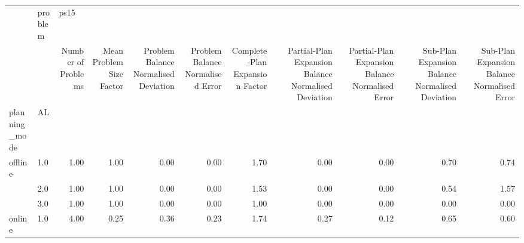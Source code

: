 \begin{tabular}{llrrrrrrrrr}
\toprule
       & problem & \multicolumn{9}{l}{ps15} \\
       & {} & Number of Problems & Mean Problem Size Factor & Problem Balance Normalised Deviation & Problem Balance Normalised Error & Complete-Plan Expansion Factor & Partial-Plan Expansion Balance Normalised Deviation & Partial-Plan Expansion Balance Normalised Error & Sub-Plan Expansion Balance Normalised Deviation & Sub-Plan Expansion Balance Normalised Error \\
planning\_mode & AL &                    &                          &                                      &                                  &                                &                                                     &                                                 &                                                 &                                             \\
\midrule
offline & 1.0 &               1.00 &                     1.00 &                                 0.00 &                             0.00 &                           1.70 &                                               0.00 &                                            0.00 &                                            0.70 &                                        0.74 \\
       & 2.0 &               1.00 &                     1.00 &                                 0.00 &                             0.00 &                           1.53 &                                               0.00 &                                            0.00 &                                            0.54 &                                        1.57 \\
       & 3.0 &               1.00 &                     1.00 &                                 0.00 &                             0.00 &                           1.00 &                                               0.00 &                                            0.00 &                                            0.00 &                                        0.00 \\
online & 1.0 &               4.00 &                     0.25 &                                 0.36 &                             0.23 &                           1.74 &                                               0.27 &                                            0.12 &                                            0.65 &                                        0.60 \\

\end{tabular}
